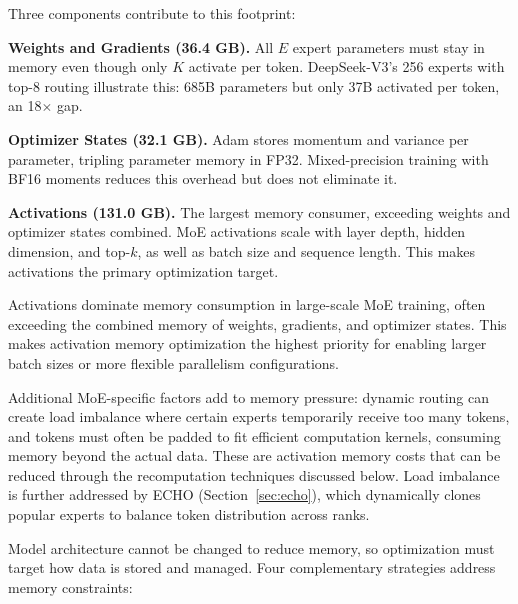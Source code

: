 Three components contribute to this footprint:

\textbf{Weights and Gradients (36.4 GB).} All $E$ expert parameters must stay in memory even though only $K$ activate per token. DeepSeek-V3's 256 experts with top-8 routing illustrate this: 685B parameters but only 37B activated per token, an 18$\times$ gap.

\textbf{Optimizer States (32.1 GB).} Adam stores momentum and variance per parameter, tripling parameter memory in FP32. Mixed-precision training with BF16 moments reduces this overhead but does not eliminate it.

\textbf{Activations (131.0 GB).} The largest memory consumer, exceeding weights and optimizer states combined. MoE activations scale with layer depth, hidden dimension, and top-$k$, as well as batch size and sequence length. This makes activations the primary optimization target.

\begin{notebox}
Activations dominate memory consumption in large-scale MoE training, often exceeding the combined memory of weights, gradients, and optimizer states. This makes activation memory optimization the highest priority for enabling larger batch sizes or more flexible parallelism configurations.
\end{notebox}

Additional MoE-specific factors add to memory pressure: dynamic routing can create load imbalance where certain experts temporarily receive too many tokens, and tokens must often be padded to fit efficient computation kernels, consuming memory beyond the actual data. These are activation memory costs that can be reduced through the recomputation techniques discussed below. Load imbalance is further addressed by ECHO (Section~\ref{sec:echo}), which dynamically clones popular experts to balance token distribution across ranks.

Model architecture cannot be changed to reduce memory, so optimization must target how data is stored and managed. Four complementary strategies address memory constraints:

